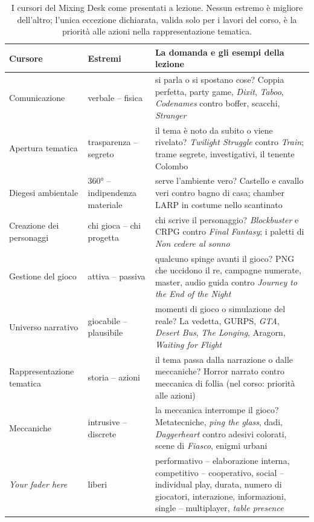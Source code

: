 \begin{table}[htbp]
\centering
\small
\begin{tabular}{@{}p{2.8cm}p{3.2cm}p{7.2cm}@{}}
\toprule
\textbf{Cursore} & \textbf{Estremi} & \textbf{La domanda e gli esempi della
lezione} \\
\midrule
Comunicazione & verbale -- fisica & si parla o si spostano cose? Coppia
perfetta, party game, \emph{Dixit}, \emph{Taboo}, \emph{Codenames} contro
boffer, scacchi, \emph{Stranger} \\
Apertura tematica & trasparenza -- segreto & il tema è noto da subito o viene
rivelato? \emph{Twilight Struggle} contro \emph{Train}; trame segrete,
investigativi, il tenente Colombo \\
Diegesi ambientale & 360° -- indipendenza materiale & serve l'ambiente vero?
Castello e cavallo veri contro bagno di casa; chamber LARP in costume nello
scantinato \\
Creazione dei personaggi & chi gioca -- chi progetta & chi scrive il personaggio?
\emph{Blockbuster} e CRPG contro \emph{Final Fantasy}; i paletti di \emph{Non
cedere al sonno} \\
Gestione del gioco & attiva -- passiva & qualcuno spinge avanti il gioco? PNG che
uccidono il re, campagne numerate, master, audio guida contro \emph{Journey to
the End of the Night} \\
Universo narrativo & giocabile -- plausibile & momenti di gioco o simulazione
del reale? La vedetta, GURPS, \emph{GTA}, \emph{Desert Bus}, \emph{The Longing},
Aragorn, \emph{Waiting for Flight} \\
Rappresentazione tematica & storia -- azioni & il tema passa dalla narrazione o
dalle meccaniche? Horror narrato contro meccanica di follia (nel corso: priorità
alle azioni) \\
Meccaniche & intrusive -- discrete & la meccanica interrompe il gioco?
Metatecniche, \emph{ping the glass}, dadi, \emph{Daggerheart} contro adesivi
colorati, scene di \emph{Fiasco}, enigmi urbani \\
\emph{Your fader here} & liberi & performativo -- elaborazione interna,
competitivo -- cooperativo, social -- individual play, durata, numero di
giocatori, interazione, informazioni, single -- multiplayer, \emph{table
presence} \\
\bottomrule
\end{tabular}
\caption{I cursori del Mixing Desk come presentati a lezione. Nessun estremo è
migliore dell'altro; l'unica eccezione dichiarata, valida solo per i lavori del
corso, è la priorità alle azioni nella rappresentazione tematica.}
\label{a3:tab:mixing}
\end{table}

